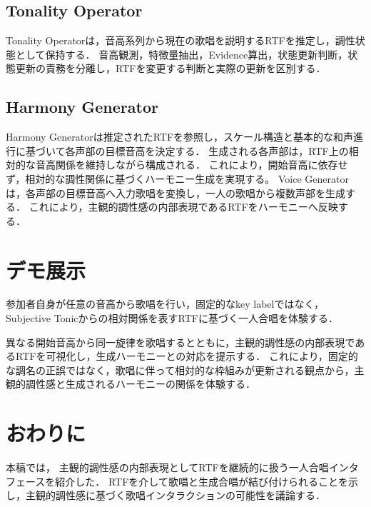 \subsection{Tonality Operator}

Tonality Operatorは，音高系列から現在の歌唱を説明するRTFを推定し，調性状態として保持する．
音高観測，特徴量抽出，Evidence算出，状態更新判断，状態更新の責務を分離し，RTFを変更する判断と実際の更新を区別する．

\subsection{Harmony Generator}

Harmony Generatorは推定されたRTFを参照し，スケール構造と基本的な和声進行に基づいて各声部の目標音高を決定する．
生成される各声部は，RTF上の相対的な音高関係を維持しながら構成される．
これにより，開始音高に依存せず，相対的な調性関係に基づくハーモニー生成を実現する。
Voice Generatorは，各声部の目標音高へ入力歌唱を変換し，一人の歌唱から複数声部を生成する．
これにより，主観的調性感の内部表現であるRTFをハーモニーへ反映する．

\section{デモ展示}

参加者自身が任意の音高から歌唱を行い，固定的なkey labelではなく，Subjective Tonicからの相対関係を表すRTFに基づく一人合唱を体験する．

異なる開始音高から同一旋律を歌唱するとともに，主観的調性感の内部表現であるRTFを可視化し，生成ハーモニーとの対応を提示する．
%
これにより，固定的な調名の正誤ではなく，歌唱に伴って相対的な枠組みが更新される観点から，主観的調性感と生成されるハーモニーの関係を体験する．



\section{おわりに}

本稿では，%
主観的調性感の内部表現としてRTFを継続的に扱う一人合唱インタフェースを紹介した．
RTFを介して歌唱と生成合唱が結び付けられることを示し，主観的調性感に基づく歌唱インタラクションの可能性を議論する．